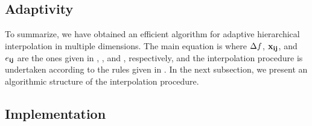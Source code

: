 \subsection{Adaptivity} 


To summarize, we have obtained an efficient algorithm for adaptive hierarchical
interpolation in multiple dimensions. The main equation is 
where $\Delta f$, $\mathbf{x}_{\mathbf{i}\mathbf{j}}$, and $e_{\mathbf{i}\mathbf{j}}$ are the ones given in
, , and ,
respectively, and the interpolation procedure is undertaken according to the
rules given in . In the next subsection, we present an
algorithmic structure of the interpolation procedure.

\subsection{Implementation} 

